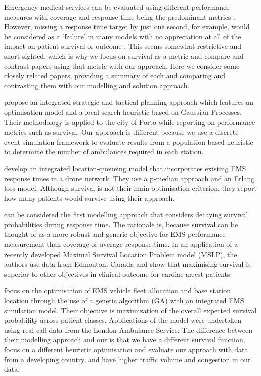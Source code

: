 \documentclass[numbers,webpdf,imaman]{ima-authoring-template}%
\begin{document}
Emergency medical services can be evaluated using different performance
measures with coverage and response time being the predominant metrics
\citep{Mclay2010evaluating}. However, missing a response time target by just
one second, for example, would be considered as a `failure' in many models
with no appreciation at all of the impact on patient survival or outcome
\citep{Mclay2010evaluating}. This seems somewhat restrictive and short-sighted,
which is why we focus on survival as a metric and
compare and contrast papers using that metric with our approach.
Here we consider some closely related papers, providing a summary of each and
comparing and contrasting them with our modelling and solution approach.

\citet{amorim2019integrated} propose an integrated strategic and tactical
planning approach which features an optimisation model and a local search
heuristic based on Gaussian Processes. Their methodology is applied to the
city of Porto while reporting on performance metrics such as survival. Our
approach is different because we use a discrete-event simulation framework
to evaluate results from a population based heuristic to determine the number of
ambulances required in each station. 

\citet{boutilier2022drone} develop an integrated location-queueing model that
incorporates existing EMS response times in a drone network. They use a
p-median approach and an Erlang loss model. Although survival is not their
main optimisation criterion,  they report how many patients would survive
using their approach.

\citet{Erkut200842} can be considered the first modelling approach
that considers decaying survival probabilities during response time. The
rationale is, because survival can be thought of as a more robust and generic
objective for EMS performance measurement than coverage or average response
time. In an application of a recently developed Maximal Survival Location
Problem model (MSLP), the authors use data from Edmonton, Canada and show that
maximising survival is superior to other objectives in clinical outcome for
cardiac arrest patients.

\citet{MCormack2015} focus on the optimisation of
EMS vehicle fleet allocation and base station location through the use of a
genetic algorithm (GA) with an integrated EMS simulation model. Their
objective is maximization of the overall expected survival probability across
patient classes. Applications of the model were undertaken using real call
data from the London Ambulance Service. The difference between their modelling
approach and our is that we have a different survival function, focus on a
different heuristic optimisation and evaluate our approach with data from a
developing country, and have higher traffic volume and congestion in our data.
\end{document}
